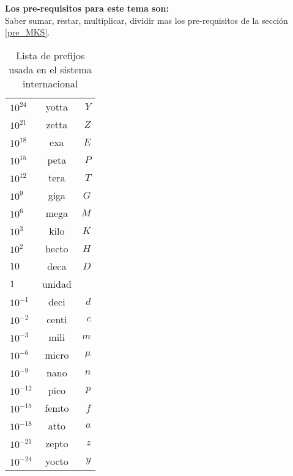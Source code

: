 \label{sec_Ordenes_Magnitud}
\begin{prere}
\begin{tcolorbox}[colback=blue!5!white,colframe=blue!75!black,boxrule=0.5pt,arc=4pt, left=6pt,right=6pt,top=6pt,bottom=6pt,boxsep=0pt] 
  \textbf{Los pre-requisitos para este tema son:}\\
  Saber sumar, restar, multiplicar, dividir mas los pre-requisitos de la secci\'on \ref{pre_MKS}.
\end{tcolorbox} 
\label{pre_ord_mag}
\end{prere}

\begin{table}[!h]
\LARGE
\begin{center}
\begin{tabular}{|l|c|r|}
\hline 
$10^{24}$ & yotta & $Y$ \\
$10^{21}$ & zetta & $Z$ \\
$10^{18}$ & exa & $E$ \\
$10^{15}$ & peta & $P$ \\
$10^{12}$ & tera & $T$ \\
$10^{9}$  & giga & $G$ \\
$10^6$ & mega & $M$ \\
$10^3$ & kilo & $K$ \\
$10^2$ & hecto & $H$ \\
$10$   & deca  & $D$ \\
$1$ & unidad &  \\
$10^{-1}$ & deci & $d$ \\
$10^{-2}$ & centi & $c$ \\
$10^{-3}$ & mili & $m$ \\
$10^{-6}$ & micro & $\mu$ \\
$10^{-9}$ & nano & $n$ \\
$10^{-12}$ & pico & $p$ \\
$10^{-15}$ & femto & $f$ \\
$10^{-18}$ & atto & $a$ \\
$10^{-21}$ & zepto & $z$ \\
$10^{-24}$ & yocto & $y$ \\
\hline
\end{tabular}
\caption{Lista de prefijos usada en el sistema internacional}
\label{tab_ord_mag}
\end{center}
\end{table}

